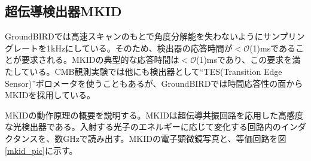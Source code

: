 \subsection{超伝導検出器MKID}
GroundBIRDでは高速スキャンのもとで角度分解能を失わないようにサンプリングレートを1kHzにしている。そのため、検出器の応答時間が$< \mathcal{O}$(1)msであることが要求される。MKIDの典型的な応答時間は$< \mathcal{O}$(1)msであり\cite{MKID_res}、この要求を満たしている。CMB観測実験では他にも検出器として``TES(Transition Edge Sensor)''ボロメータを使うこともあるが、GroundBIRDでは時間応答性の面からMKIDを採用している。

MKIDの動作原理の概要を説明する。MKIDは超伝導共振回路を応用した高感度な光検出器である。入射する光子のエネルギーに応じて変化する回路内のインダクタンスを、数GHzで読み出す。MKIDの電子顕微鏡写真\cite{MKID_pic}と、等価回路を図\ref{mkid_pic}に示す。


